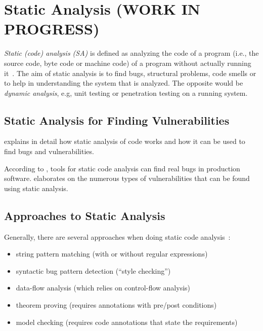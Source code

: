 \chapter{Static Analysis (WORK IN PROGRESS)}
\label{static-analysis}

\emph{Static (code) analysis (SA)} is defined as analyzing the code of a program (i.e., the source code, byte code or machine code) of a program without actually running it~\cite{chess-west}. The aim of static analysis is to find bugs, structural problems, code smells or to help in understanding the system that is analyzed. The opposite would be \emph{dynamic analysis}, e.g, unit testing or penetration testing on a running system.

\section{Static Analysis for Finding Vulnerabilities}
\cite{chess-west} explains in detail how static analysis of code works and how it can be used to find bugs and vulnerabilities.

According to \cite{findbugs, evaluating}, tools for static code analysis can find real bugs in production software. \cite{coverity-report} elaborates on the numerous types of vulnerabilities that can be found using static analysis.

\section{Approaches to Static Analysis}
Generally, there are several approaches when doing static code analysis~\cite{comparison-of-bug-finding-tools, swaat, google-code-search}:

\begin{itemize}
 \item string pattern matching (with or without regular expressions)
 \item syntactic bug pattern detection (``style checking'')
 \item data-flow analysis (which relies on control-flow analysis) 
 \item theorem proving (requires annotations with pre/post conditions)
 \item model checking (requires code annotations that state the requirements)
\end{itemize}

